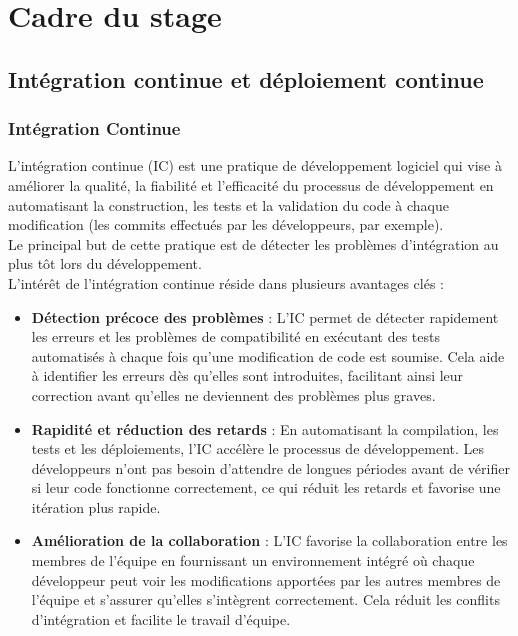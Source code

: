 \chapter{Cadre du stage}
	\section{Intégration continue et déploiement continue}
		\subsection{Intégration Continue}
			L'intégration continue (IC) est une pratique de développement logiciel qui vise à améliorer la qualité, la fiabilité et l'efficacité du processus de développement en automatisant la construction, les tests et la validation du code à chaque modification (les commits effectués par les développeurs, par exemple).\\
			Le principal but de cette pratique est de détecter les problèmes d'intégration au plus tôt lors du développement.\\
			L'intérêt de l'intégration continue réside dans plusieurs avantages clés :\\
			\begin{itemize}
				\item \textbf{Détection précoce des problèmes} : L'IC permet de détecter rapidement les erreurs et les problèmes de compatibilité en exécutant des tests automatisés à chaque fois qu'une modification de code est soumise. Cela aide à identifier les erreurs dès qu'elles sont introduites, facilitant ainsi leur correction avant qu'elles ne deviennent des problèmes plus graves.\\
				\item \textbf{Rapidité et réduction des retards} : En automatisant la compilation, les tests et les déploiements, l'IC accélère le processus de développement. Les développeurs n'ont pas besoin d'attendre de longues périodes avant de vérifier si leur code fonctionne correctement, ce qui réduit les retards et favorise une itération plus rapide.\\
				\item \textbf{Amélioration de la collaboration} : L'IC favorise la collaboration entre les membres de l'équipe en fournissant un environnement intégré où chaque développeur peut voir les modifications apportées par les autres membres de l'équipe et s'assurer qu'elles s'intègrent correctement. Cela réduit les conflits d'intégration et facilite le travail d'équipe.
			\end{itemize}
		
